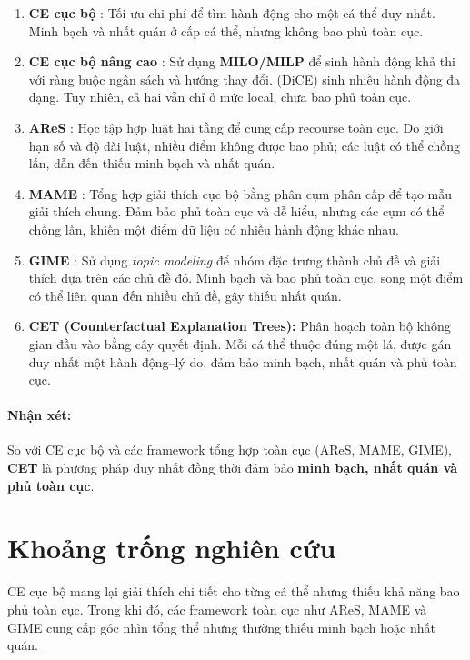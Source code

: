 \begin{enumerate}
\item \textbf{CE cục bộ} \parencite{wachter2018counterfactualexplanationsopeningblack, karimi2021surveyalgorithmicrecoursedefinitions, Kanamori:AISTATS2022, schut2021}:
Tối ưu chi phí để tìm hành động cho một cá thể duy nhất. Minh bạch và nhất quán ở cấp cá thể, nhưng không bao phủ toàn cục.

\item \textbf{CE cục bộ nâng cao} \parencite{Ustun_2019, mothilal}: 
Sử dụng \textbf{MILO/MILP} để sinh hành động khả thi với ràng buộc ngân sách và hướng thay đổi. (DiCE) sinh nhiều hành động đa dạng. Tuy nhiên, cả hai vẫn chỉ ở mức local, chưa bao phủ toàn cục.  

\item \textbf{AReS} \parencite{rawal2020ares}:  
Học tập hợp luật hai tầng để cung cấp recourse toàn cục. Do giới hạn số và độ dài luật, nhiều điểm không được bao phủ; các luật có thể chồng lấn, dẫn đến thiếu minh bạch và nhất quán.  

\item \textbf{MAME} \parencite{ramamurthy2020}:  
Tổng hợp giải thích cục bộ bằng phân cụm phân cấp để tạo mẫu giải thích chung. Đảm bảo phủ toàn cục và dễ hiểu, nhưng các cụm có thể chồng lấn, khiến một điểm dữ liệu có nhiều hành động khác nhau.  

\item \textbf{GIME} \parencite{gao2021learning}:  
Sử dụng \textit{topic modeling} để nhóm đặc trưng thành chủ đề và giải thích dựa trên các chủ đề đó. Minh bạch và bao phủ toàn cục, song một điểm có thể liên quan đến nhiều chủ đề, gây thiếu nhất quán.  

\item \textbf{CET (Counterfactual Explanation Trees):}  
Phân hoạch toàn bộ không gian đầu vào bằng cây quyết định. Mỗi cá thể thuộc đúng một lá, được gán duy nhất một hành động–lý do, đảm bảo minh bạch, nhất quán và phủ toàn cục.  


\end{enumerate}

\paragraph{Nhận xét:} So với CE cục bộ và các framework tổng hợp toàn cục (AReS, MAME, GIME), \textbf{CET} là phương pháp duy nhất đồng thời đảm bảo \textbf{minh bạch, nhất quán và phủ toàn cục}.

\section{Khoảng trống nghiên cứu}
CE cục bộ \parencite{wachter2018counterfactualexplanationsopeningblack, karimi2021surveyalgorithmicrecoursedefinitions, Ustun_2019} mang lại giải thích chi tiết cho từng cá thể nhưng thiếu khả năng bao phủ toàn cục. Trong khi đó, các framework toàn cục như AReS, MAME và GIME cung cấp góc nhìn tổng thể nhưng thường thiếu minh bạch hoặc nhất quán.

